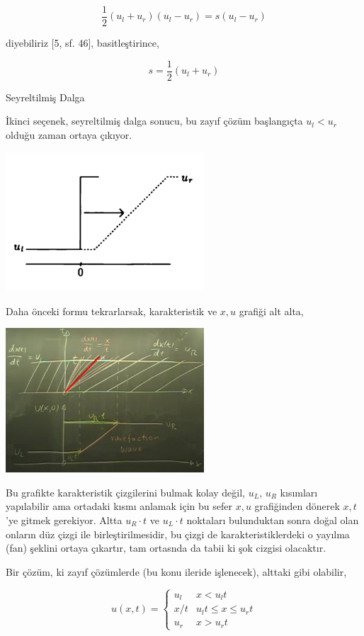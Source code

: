 \documentclass[12pt,fleqn]{article}\usepackage{../../common}
\begin{document}
$$
\frac{1}{2} (u_l + u_r)(u_l - u_r) = s(u_l-u_r)
$$

diyebiliriz [5, sf. 46], basitleştirince,

$$
s = \frac{1}{2} (u_l + u_r)
$$

Seyreltilmiş Dalga

İkinci seçenek, seyreltilmiş dalga sonucu, bu zayıf çözüm başlangıçta
$u_l < u_r$ olduğu zaman ortaya çıkıyor.

\includegraphics[width=20em]{compscieng_bpp50fv1_02.png}

Daha önceki formu tekrarlarsak, karakteristik ve $x,u$ grafiği alt alta,

\includegraphics[width=20em]{compscieng_bpp50fv1_06.png}

Bu grafikte karakteristik çizgilerini bulmak kolay değil, $u_L$, $u_R$ kısımları
yapılabilir ama ortadaki kısmı anlamak için bu sefer $x,u$ grafiğinden dönerek
$x,t$'ye gitmek gerekiyor. Altta $u_R \cdot t$ ve $u_L \cdot t$ noktaları
bulunduktan sonra doğal olan onların düz çizgi ile birleştirilmesidir, bu çizgi
de karakteristiklerdeki o yayılma (fan) şeklini ortaya çıkartır, tam ortasnda da
tabii ki şok cizgisi olacaktır. 

Bir çözüm, ki zayıf çözümlerde (bu konu ileride işlenecek), alttaki gibi olabilir,

$$
u(x,t) =
\left\{ \begin{array}{ll}
u_l & x < u_l t  \\
x/t & u_l t \le x \le u_r t \\
u_r & x > u_r t
\end{array} \right.
$$
\end{document}
